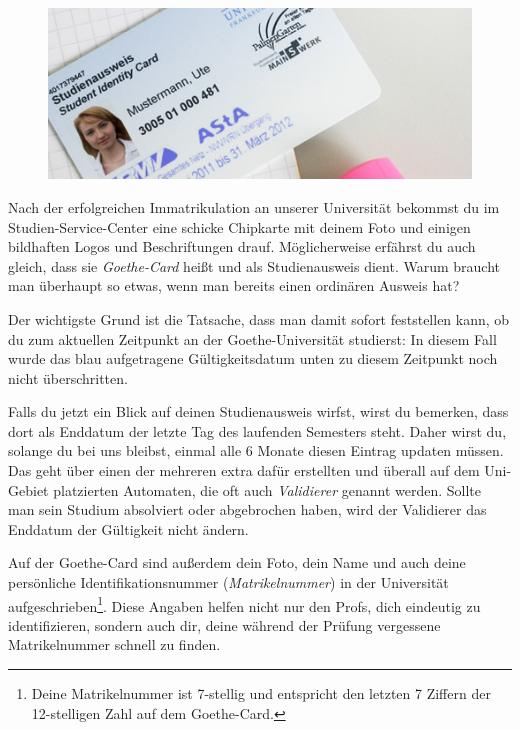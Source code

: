 \begin{figure}
     \vspace{-3mm}
  \begin{center}
     \includegraphics[scale=0.5]{bitmaps/goethecard}
  \end{center}
\end{figure}

Nach der erfolgreichen Immatrikulation an unserer Universität bekommst du im Studien-Service-Center eine schicke Chipkarte mit deinem Foto und einigen bildhaften Logos und Beschriftungen drauf. Möglicherweise erfährst du auch gleich, dass sie \emph{Goethe-Card} heißt und als Studienausweis dient. Warum braucht man überhaupt so etwas, wenn man bereits einen ordinären Ausweis hat?

Der wichtigste Grund ist die Tatsache, dass man damit sofort feststellen kann, ob du zum aktuellen Zeitpunkt an der Goethe-Universität studierst: In diesem Fall wurde das blau aufgetragene Gültigkeitsdatum unten zu diesem Zeitpunkt noch nicht überschritten. 

Falls du jetzt ein Blick auf deinen Studienausweis wirfst, wirst du bemerken, dass dort als Enddatum der letzte Tag des laufenden Semesters steht. Daher wirst du, solange du bei uns bleibst, einmal alle 6 Monate diesen Eintrag updaten müssen. Das geht über einen der mehreren extra dafür erstellten und überall auf dem Uni-Gebiet platzierten Automaten, die oft auch \emph{Validierer} genannt werden. Sollte man sein Studium absolviert oder abgebrochen haben, wird der Validierer das Enddatum der Gültigkeit nicht ändern.

Auf der Goethe-Card sind außerdem dein Foto, dein Name und auch deine persönliche Identifikationsnummer (\emph{Matrikelnummer}) in der Universität aufgeschrieben\footnote{Deine Matrikelnummer ist 7-stellig und entspricht den letzten 7 Ziffern der 12\hbox{-}stelligen Zahl auf dem Goethe-Card.}. Diese Angaben helfen nicht nur den Profs, dich eindeutig zu identifizieren, sondern auch dir, deine während der Prüfung vergessene Matrikelnummer schnell zu finden.

